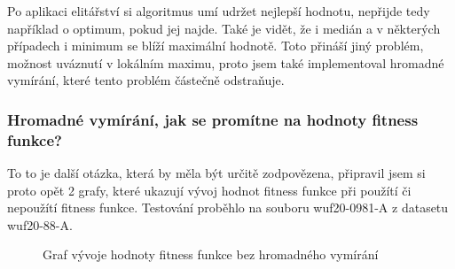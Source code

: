 \documentclass{article}
\begin{document}
    Po aplikaci elitářství si algoritmus umí udržet nejlepší hodnotu, nepřijde tedy například o optimum, pokud jej najde. Také je vidět, že i medián a v některých případech i minimum
    se blíží maximální hodnotě. Toto přináší jiný problém, možnost uváznutí v lokálním maximu, proto jsem také implementoval hromadné vymírání, které tento problém částečně odstraňuje.

    \subsubsection{Hromadné vymírání, jak se promítne na hodnoty fitness funkce?}

    To to je další otázka, která by měla být určitě zodpovězena, připravil jsem si proto opět 2 grafy, které ukazují vývoj hodnot fitness funkce při použítí či nepoužítí fitness funkce.
    Testování proběhlo na souboru wuf20-0981-A z datasetu wuf20-88-A.

    \begin{figure}[H]
        \begin{center}
            \caption{Graf vývoje hodnoty fitness funkce bez hromadného vymírání}
        \end{center}
    \end{figure}
\end{document}
